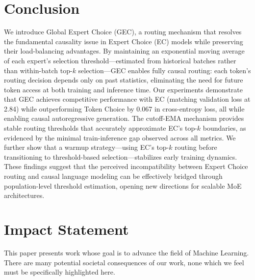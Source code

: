 \documentclass{article}
\theoremstyle{plain}
\theoremstyle{definition}
\theoremstyle{remark}
\begin{document}

\section{Conclusion}

We introduce Global Expert Choice (GEC), a routing mechanism that resolves the fundamental causality issue in Expert Choice (EC) models while preserving their load-balancing advantages. By maintaining an exponential moving average of each expert's selection threshold—estimated from historical batches rather than within-batch top-$k$ selection—GEC enables fully causal routing: each token's routing decision depends only on past statistics, eliminating the need for future token access at both training and inference time. Our experiments demonstrate that GEC achieves competitive performance with EC (matching validation loss at 2.84) while outperforming Token Choice by 0.067 in cross-entropy loss, all while enabling causal autoregressive generation. The cutoff-EMA mechanism provides stable routing thresholds that accurately approximate EC's top-$k$ boundaries, as evidenced by the minimal train-inference gap observed across all metrics. We further show that a warmup strategy—using EC's top-$k$ routing before transitioning to threshold-based selection—stabilizes early training dynamics. These findings suggest that the perceived incompatibility between Expert Choice routing and causal language modeling can be effectively bridged through population-level threshold estimation, opening new directions for scalable MoE architectures.


\section*{Impact Statement}

This paper presents work whose goal is to advance the field of Machine Learning. There are many potential societal consequences of our work, none which we feel must be specifically highlighted here.
\end{document}

